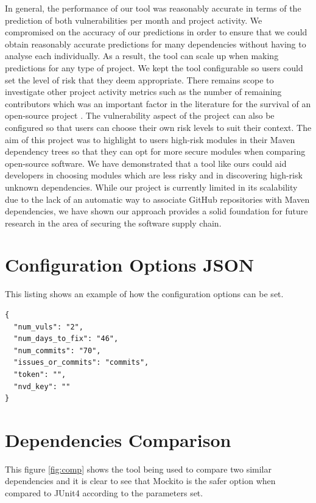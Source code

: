 \documentclass[conference]{IEEEtran}
\begin{document}
In general, the performance of our tool was reasonably accurate in terms of the prediction of both vulnerabilities per month and project activity. We compromised on the accuracy of our predictions in order to ensure that we could obtain reasonably accurate predictions for many dependencies without having to analyse each individually. As a result, the tool can scale up when making predictions for any type of project. We kept the tool configurable so users could set the level of risk that they deem appropriate. There remains scope to investigate other project activity metrics such as the number of remaining contributors which was an important factor in the literature for the survival of an open-source project \cite{l_bao_large_2021}. The vulnerability aspect of the project can also be configured so that users can choose their own risk levels to suit their context. The aim of this project was to highlight to users high-risk modules in their Maven dependency trees so that they can opt for more secure modules when comparing open-source software. We have demonstrated that a tool like ours could aid developers in choosing modules which are less risky and in discovering high-risk unknown dependencies. While our project is currently limited in its scalability due to the lack of an automatic way to associate GitHub repositories with Maven dependencies, we have shown our approach provides a solid foundation for future research in the area of securing the software supply chain. 



\appendices

\section{Configuration Options JSON}
This listing shows an example of how the configuration options can be set. 

\begin{lstlisting}[caption=Configuration Options]
{
  "num_vuls": "2",
  "num_days_to_fix": "46",
  "num_commits": "70",
  "issues_or_commits": "commits",
  "token": "",
  "nvd_key": ""
}
\end{lstlisting}

\section{Dependencies Comparison}
This figure \ref{fig:comp} shows the tool being used to compare two similar dependencies and it is clear to see that Mockito is the safer option when compared to JUnit4 according to the parameters set. 
\end{document}
